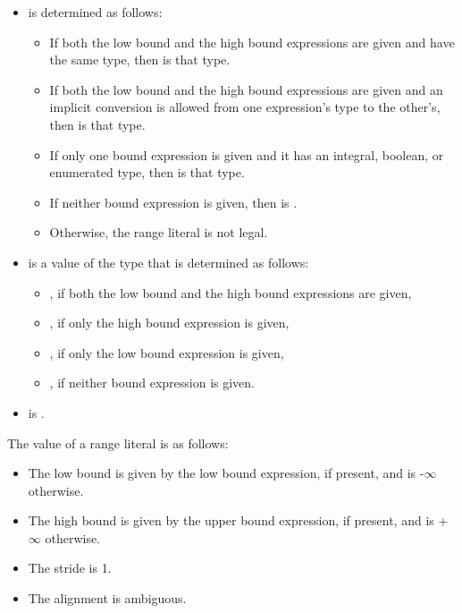 \begin{itemize}

\item {} is determined as follows:
  \begin{itemize}

  \item If both the low bound and the high bound expressions are given
        and have the same type, then  is that type.

  \item If both the low bound and the high bound expressions are given
        and an implicit conversion is allowed from one expression's type
        to the other's, then  is that type.

  \item If only one bound expression is given and it has an integral, boolean, or
        enumerated type, then  is that type.

  \item If neither bound expression is given, then  is
        .

  \item Otherwise, the range literal is not legal.
  \end{itemize}

\item {} is a value of the type 
that is determined as follows:
  \begin{itemize}

  \item {}, if both the low bound and the high bound expressions
         are given,

  \item {}, if only the high bound expression is given,

  \item {}, if only the low bound expression is given,

  \item {}, if neither bound expression is given.
  \end{itemize}

\item {} is .

\end{itemize}

The value of a range literal is as follows:

\begin{itemize}

\item The low bound is given by the low bound expression,
if present, and is -$\infty$ otherwise.

\item The high bound is given by the upper bound expression,
if present, and is +$\infty$ otherwise.

\item The stride is 1.

\item The alignment is ambiguous.

\end{itemize}


